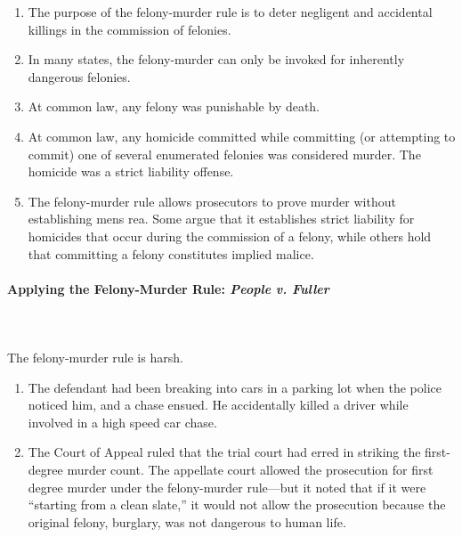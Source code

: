 \begin{enumerate}
    \item The purpose of the felony-murder rule is to deter negligent and 
    accidental killings in the commission of felonies.
    \item In many states, the felony-murder can only be invoked for inherently 
    dangerous felonies.
    \item At common law, any felony was punishable by death.
    \item At common law, any homicide committed while committing (or 
    attempting to commit) one of several enumerated felonies was considered 
    murder. The homicide was a strict liability offense.
    \item The felony-murder rule allows prosecutors to prove murder without 
    establishing mens rea. Some argue that it establishes strict liability for 
    homicides that occur during the commission of a felony, while others hold 
    that committing a felony constitutes implied malice.
\end{enumerate}

\paragraph{Applying the Felony-Murder Rule: \emph{People v. Fuller}} 
~\\\\
The felony-murder rule is harsh.

\begin{enumerate}
    \item The defendant had been breaking into cars in a parking lot when the 
    police noticed him, and a chase ensued. He accidentally killed a driver 
    while involved in a high speed car chase.
    \item The Court of Appeal ruled that the trial court had erred in striking 
    the first-degree murder count. The appellate court allowed the prosecution 
    for first degree murder under the felony-murder rule---but it noted that 
    if it were ``starting from a clean slate,'' it would not allow the 
    prosecution because the original felony, burglary, was not dangerous to 
    human life.
\end{enumerate}

